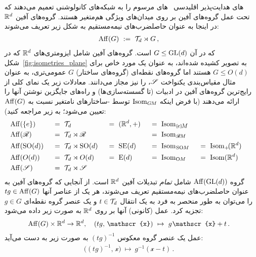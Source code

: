 های هدایت‌پذیر اقلیدسی~\cite{Cohen2017-STEER,3d_steerableCNNs,Weiler2019_E2CNN} های مرسوم را به شبکه‌های کانولوشنی تعمیم می‌دهند که تحت عمل گروه‌های آفین بر روی میدان‌های ویژگی هم‌متغیر هستند.
گروه‌های آفین $\mathbb{R}^d$ در اینجا به عنوان حاصلضرب‌های نیمه‌مستقیم به شکل زیر تعریف می‌شوند:
\begin{align}\label{eq:AffG_def}
	\operatorname{Aff}(G)\ :=\ \mathcal{T}_d \rtimes G \,,
\end{align}
که در آن $G\leq\operatorname{GL}(d)$ است.
گروه‌های آفین شامل ایزومتری‌های $\mathbb{R}^d$ که در شکل~\ref{fig:isometries_plane} به تصویر کشیده شده‌اند، به عنوان یک مورد خاص برای $G\leq O(d)$ هستند اما گروه‌های نقطه‌ای (گروه‌های ساختار) $G$ عمومی‌تری، به عنوان مثال مقیاس‌بندی یکنواخت $\mathscr{S}$، را نیز مجاز می‌دانند.
معادلات زیر یک نمای کلی از رایج‌ترین گروه‌های آفین در ادبیات (تا گسسته‌سازی‌ها) و راه‌های جایگزین نوشتن آنها را ارائه می‌دهند (با فرض اینکه $\operatorname{Isom}_{G\mkern-1.4muM}$ توسط -ساختارهای نامتغیر نسبت به $\operatorname{Aff}(G)$ تعیین می‌شود؛ به زیر مراجعه کنید):
\begin{alignat}{5}
	&\Aff(\{e\}) \ &&=\ \Trans_d               \ &&=\ (\R^d,+)\ &&=\ \IsomeM \notag \\
	&\Aff(\Flip) \ &&=\ \Trans_d \rtimes \Flip   &&                \ &&=\ \IsomRM \notag \\
	&\Aff(\SO{d})\ &&=\ \Trans_d \rtimes \SO{d} \ &&=\ \SE{d}  \ &&=\ \IsomSOM\ &&=\ \Isom_+\!(\R^d) \\
	&\Aff(O(d)) \ &&=\ \Trans_d \rtimes O(d)  \ &&=\  \E{d}  \ &&=\ \IsomOM \ &&=\ \Isom(\R^d) \notag \\
	&\Aff(\Scale)\ &&=\ \Trans_d \rtimes \Scale \notag
\end{alignat}
گروه $\operatorname{Aff}(\operatorname{GL}(d))$ شامل \emph{تمام} تبدیلات آفین $\mathbb{R}^d$ است.
از آنجایی که گروه‌های آفین به عنوان حاصلضرب‌های نیمه‌مستقیم تعریف می‌شوند، هر یک از عناصر آنها $tg \in \operatorname{Aff}(G)$ را می‌توان به طور منحصر به فرد به یک انتقال $t\in \mathcal{T}_d$ و یک عنصر گروه نقطه‌ای $g\in G$ تجزیه کرد.
عمل (کانونی) آنها بر روی $\mathbb{R}^d$ به صورت زیر داده می‌شود:
\begin{align}
	\Aff(G)\times\R^d \to \R^d, \quad (tg,\, \mathscr{x})\ \mapsto\ g\mkern1mu \mathscr{x} + t \,.
\end{align}
عمل یک عنصر گروه معکوس $(tg)^{-1}$ به صورت زیر به دست می‌آید:
\begin{align}
	\big( (tg)^{-1},\, \mathscr{x}\big)\ \mapsto\ g^{-1} (\mathscr{x} - t) \,.
\end{align}


